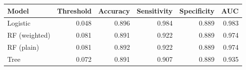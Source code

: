 
\begin{tabular}{lrrrrr}
\toprule
Model & Threshold & Accuracy & Sensitivity & Specificity & AUC\\
\midrule
Logistic & 0.048 & 0.896 & 0.984 & 0.889 & 0.983\\
RF (weighted) & 0.081 & 0.891 & 0.922 & 0.889 & 0.974\\
RF (plain) & 0.081 & 0.892 & 0.922 & 0.889 & 0.974\\
Tree & 0.072 & 0.891 & 0.907 & 0.889 & 0.935\\
\bottomrule
\end{tabular}
